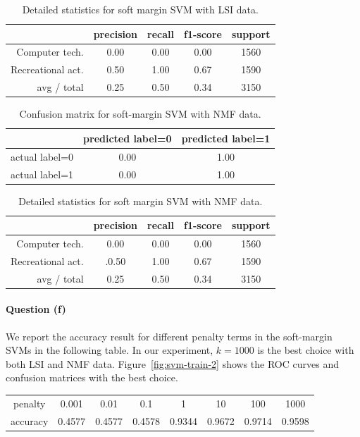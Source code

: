 \documentclass[letterpaper]{article}
\begin{document}
\begin{table}[H]
\centering
\begin{tabular}{r|cccc}
 & precision & recall & f1-score & support \\ \hline
Computer tech. & 0.00 & 0.00 & 0.00 & 1560 \\
Recreational act. & 0.50 & 1.00 & 0.67 & 1590 \\
avg / total & 0.25 & 0.50 & 0.34 & 3150 \\
\end{tabular}
\caption{Detailed statistics for soft margin SVM with LSI data.}
\end{table}

\begin{table}[H]
\centering
\begin{tabular}{c|cc}
 & predicted label=0 & predicted label=1 \\ \hline
actual label=0 & 0.00 & 1.00 \\
actual label=1 & 0.00 & 1.00 \\
\end{tabular}
\caption{Confusion matrix for soft-margin SVM with NMF data.}
\end{table}

\begin{table}[H]
\centering
\begin{tabular}{r|cccc}
 & precision & recall & f1-score & support \\ \hline
Computer tech. & 0.00 & 0.00 & 0.00 & 1560 \\
Recreational act. & .0.50 & 1.00 & 0.67 & 1590 \\
avg / total & 0.25 & 0.50 & 0.34 & 3150 \\
\end{tabular}
\caption{Detailed statistics for soft margin SVM with NMF data.}
\end{table}

\paragraph{Question (f)}
We report the accuracy result for different penalty terms
in the soft-margin SVMs in the following table.
In our experiment, $k=1000$ is the best choice with both LSI and NMF data.
Figure~\ref{fig:svm-train-2} shows the ROC curves and
confusion matrices with the best choice.
\begin{table}[H]
\centering
\begin{tabular}{cccccccc} \hline
penalty & 0.001 & 0.01 & 0.1 & 1 & 10 & 100 & 1000 \\
accuracy & 0.4577 & 0.4577 & 0.4578 & 0.9344 & 0.9672 & 0.9714 & 0.9598 \\
\hline
\end{tabular}
\end{table}
\end{document}
